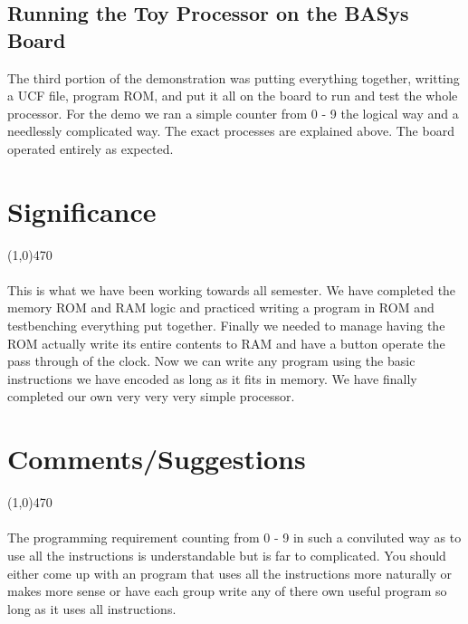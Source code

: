 \documentclass[12pt]{article}
\begin{document}
	\subsection{Running the Toy Processor on the BASys Board}
		The third portion of the demonstration was putting everything together, writting a UCF file, program ROM, and put it all on the board to run and test the whole processor. For the demo we ran a simple counter from 0 - 9 the logical way and a needlessly complicated way. The exact processes are explained above. The board operated entirely as expected.
	
	\newpage
\section{Significance} \vspace{-.7cm} \line(1,0){470}
	\paragraph{} 
		This is what we have been working towards all semester. We have completed the memory ROM and RAM logic and practiced writing a program in ROM and testbenching everything put together. Finally we needed to manage having the ROM actually write its entire contents to RAM and have a button operate the pass through of the clock. Now we can write any program using the basic instructions we have encoded as long as it fits in memory. We have finally completed our own very very very simple processor.

 \section{Comments/Suggestions}\vspace{-.7cm} \line(1,0){470}
 	\paragraph{} 
 		The programming requirement counting from 0 - 9 in such a conviluted way as to use all the instructions is understandable but is far to complicated. You should either come up with an program that uses all the instructions more naturally or makes more sense or have each group write any of there own useful program so long as it uses all instructions.
		
\end{document}
